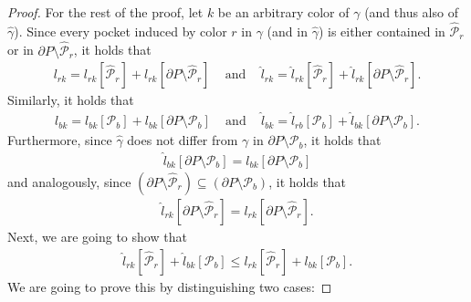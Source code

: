 \documentclass{llncs}
\begin{document}
\begin{proof}
For the rest of the proof, let $k$ be an arbitrary color of $\gamma$ (and thus also of $\hat \gamma$). Since every pocket induced by color $r$ in $\gamma$ (and in $\hat \gamma$) is either contained in $\hat {\mathcal{P}}_r$ or in $\partial P \setminus \hat {\mathcal{P}}_r$, it holds that 
\begin{align}
l_{rk} = l_{rk}[\hat {\mathcal{P}}_r] + l_{rk}[\partial P \setminus \hat {\mathcal{P}}_r] 
\hspace{10pt} \text{  and  } \hspace{10pt}  
\hat  l_{rk} = \hat l_{rk}[\hat {\mathcal{P}}_r] + \hat  l_{rk}[\partial P \setminus \hat {\mathcal{P}}_r].
\label{sameOutR}
\end{align}
Similarly, it holds that
\begin{align}
l_{bk} = l_{bk}[\mathcal{P}_b] + l_{bk}[\partial P \setminus \mathcal{P}_b]
\hspace{10pt} \text{  and  } \hspace{10pt}
\hat l_{bk} = \hat l_{rb}[\mathcal{P}_b] + \hat l_{bk}[\partial P \setminus \mathcal{P}_b].
\label{sameOutB}
\end{align}
Furthermore, since $\hat \gamma$ does not differ from $\gamma$ in $\partial P \setminus \mathcal{P}_b$, it holds that 
\begin{align}
\hat l_{bk}[\partial P \setminus \mathcal{P}_b] =  l_{bk}[ \partial P \setminus \mathcal{P}_b]
\label{sameHatB}
\end{align}
and analogously, since $(\partial P \setminus \hat {\mathcal{P}}_r)  \subseteq (\partial P \setminus \mathcal{P}_b)$, it holds that
\begin{align}
\hat l_{rk}[ \partial P \setminus \hat{ \mathcal{P}}_r] =  l_{rk}[ \partial P \setminus \hat {\mathcal{P}}_r].
\label{sameHatR}
\end{align}
Next, we are going to show that 
\begin{align}
\hat l_{rk}[\hat{ \mathcal{P}}_r] + \hat l_{bk}[{ \mathcal{P}}_b]  \leq  l_{rk}[\hat{ \mathcal{P}}_r] + l_{bk}[{ \mathcal{P}}_b].
\label{eqIneq}
\end{align}
We are going to prove this by distinguishing two cases:

\end{proof}
\end{document}
